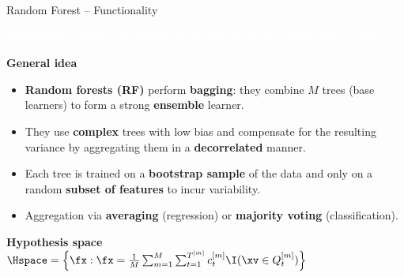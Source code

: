\documentclass[11pt,compress,t,notes=noshow, xcolor=table]{beamer}
\newcommand{\maketag}[1]{\colorbox{highlightcol}{\textcolor{white}
{\MakeUppercase{#1}}}}
\newcommand{\highlight}[1]{\textcolor{highlightcol}{\textbf{#1}}}
\begin{document}
\begin{frame}{Random Forest -- Functionality}

\footnotesize

\maketag{SUPERVISED}
\maketag{NON-PARAMETRIC}
\maketag{BLACK-BOX}
\maketag{FEATURE SELECTION}

\medskip

\highlight{General idea} 
\begin{itemize}
  \item \textbf{Random forests (RF)} perform \textbf{bagging}: they combine 
  $M$ trees (base learners) to form a strong \textbf{ensemble} learner. 
  \item They use \textbf{complex} trees with low  bias and compensate for the
  resulting variance by aggregating them in a \textbf{decorrelated} manner. 
  \item Each tree is trained on a \textbf{bootstrap sample} of the data and 
  only on a random \textbf{subset of features} to incur variability.
  \item Aggregation via \textbf{averaging} (regression) or 
  \textbf{majority voting} (classification).
\end{itemize}

\medskip

\highlight{Hypothesis space} ~~
$\Hspace = \left\{ \fx: \fx = \frac{1}{M} \sum_{m = 1}^M \sum_{t = 1}^{T^{[m]}} 
c_t^{[m]} \I(\xv \in Q_t^{[m]}) \right\}$

\medskip


\end{frame}
\end{document}
